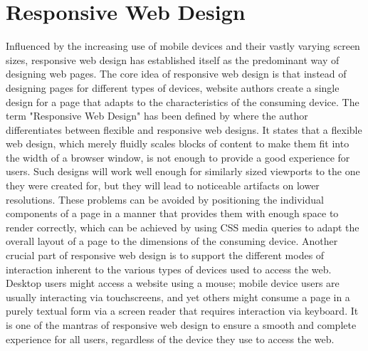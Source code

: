\section{Responsive Web Design}
\label{sec:RWD}

Influenced by the increasing use of mobile devices and their vastly varying screen sizes, responsive web design has established itself as the predominant way of designing web pages. The core idea of responsive web design is that instead of designing pages for different types of devices, website authors create a single design for a page that adapts to the characteristics of the consuming device. The term "Responsive Web Design" has been defined by \cite{ResponsiveWebDesign} where the author differentiates between flexible and responsive web designs. It states that a flexible web design, which merely fluidly scales blocks of content to make them fit into the width of a browser window, is not enough to provide a good experience for users. Such designs will work well enough for similarly sized viewports to the one they were created for, but they will lead to noticeable artifacts on lower resolutions. These problems can be avoided by positioning the individual components of a page in a manner that provides them with enough space to render correctly, which can be achieved by using CSS media queries to adapt the overall layout of a page to the dimensions of the consuming device. Another crucial part of responsive web design is to support the different modes of interaction inherent to the various types of devices used to access the web. Desktop users might access a website using a mouse; mobile device users are usually interacting via touchscreens, and yet others might consume a page in a purely textual form via a screen reader that requires interaction via keyboard. It is one of the mantras of responsive web design to ensure a smooth and complete experience for all users, regardless of the device they use to access the web. 
